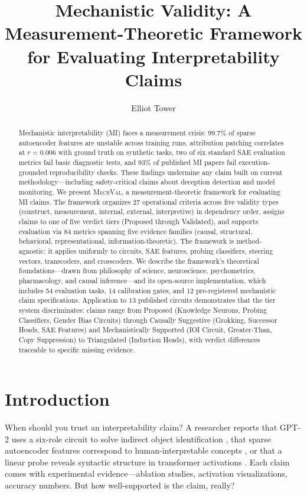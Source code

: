 \documentclass[10pt]{article}
\title{Mechanistic Validity: A Measurement-Theoretic Framework for Evaluating Interpretability Claims}
\author[1]{Elliot Tower}
\affil[1]{Independent Researcher, \texttt{elliot@elliottower.com}}
\date{}
\newcommand{\mechval}{\textsc{MechVal}}
\begin{document}
\maketitle

\begin{abstract}
Mechanistic interpretability (MI) faces a measurement crisis: 99.7\% of sparse autoencoder features are unstable across training runs, attribution patching correlates at $r = 0.006$ with ground truth on synthetic tasks, two of six standard SAE evaluation metrics fail basic diagnostic tests, and 93\% of published MI papers fail execution-grounded reproducibility checks. These findings undermine any claim built on current methodology---including safety-critical claims about deception detection and model monitoring. We present \mechval{}, a measurement-theoretic framework for evaluating MI claims. The framework organizes 27 operational criteria across five validity types (construct, measurement, internal, external, interpretive) in dependency order, assigns claims to one of five verdict tiers (Proposed through Validated), and supports evaluation via 84 metrics spanning five evidence families (causal, structural, behavioral, representational, information-theoretic). The framework is method-agnostic: it applies uniformly to circuits, SAE features, probing classifiers, steering vectors, transcoders, and crosscoders. We describe the framework's theoretical foundations---drawn from philosophy of science, neuroscience, psychometrics, pharmacology, and causal inference---and its open-source implementation, which includes 54 evaluation tasks, 14 calibration gates, and 12 pre-registered mechanistic claim specifications. Application to 13 published circuits demonstrates that the tier system discriminates: claims range from Proposed (Knowledge Neurons, Probing Classifiers, Gender Bias Circuits) through Causally Suggestive (Grokking, Successor Heads, SAE Features) and Mechanistically Supported (IOI Circuit, Greater-Than, Copy Suppression) to Triangulated (Induction Heads), with verdict differences traceable to specific missing evidence.
\end{abstract}

\section{Introduction}
\label{sec:intro}

When should you trust an interpretability claim? A researcher reports that GPT-2 uses a six-role circuit to solve indirect object identification \citep{wang2023interpretability}, that sparse autoencoder features correspond to human-interpretable concepts \citep{cunningham2023sparse}, or that a linear probe reveals syntactic structure in transformer activations \citep{belinkov2022probing}. Each claim comes with experimental evidence---ablation studies, activation visualizations, accuracy numbers. But how well-supported is the claim, really?
\end{document}
